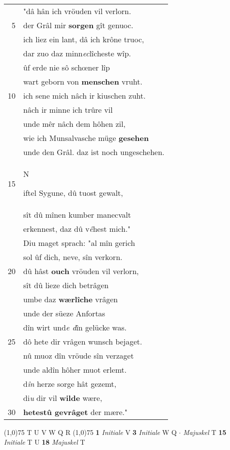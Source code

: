 \documentclass[8pt,a4paper,notitlepage]{article}
\begin{document}
\begin{table}[ht]
\begin{minipage}[t]{0.5\linewidth}
\begin{tabular}{rl}
 & "dâ hân ich vröuden vil verlorn.\\ 
5 & der Grâl mir \textbf{sorgen} gît genuoc.\\ 
 & ich liez ein lant, dâ ich krône truoc,\\ 
 & dar zuo daz minn\textit{ec}lîcheste wîp.\\ 
 & ûf erde nie sô schœner lîp\\ 
 & wart geborn von \textbf{menschen} vruht.\\ 
10 & ich sene mich nâch ir kiuschen zuht.\\ 
 & nâch ir minne ich trûre vil\\ 
 & unde mêr nâch dem hôhen zil,\\ 
 & wie ich Munsalvasche müge \textbf{gesehen}\\ 
 & unde den Grâl. daz ist noch ungeschehen.\\ 
15 & \begin{large}N\end{large}iftel Sygune, dû tuost gewalt,\\ 
 & sît dû mînen kumber manecvalt\\ 
 & erkennest, daz dû v\textit{ê}hest mich."\\ 
 & Diu maget sprach: "al mîn gerich\\ 
 & sol ûf dich, neve, sîn verkorn.\\ 
20 & dû hâst \textbf{ouch} vröuden vil verlorn,\\ 
 & sît dû lieze dich betrâgen\\ 
 & umbe daz \textbf{wærlîche} vrâgen\\ 
 & unde der süeze Anfortas\\ 
 & dîn wirt und\textit{e d}în gelücke was.\\ 
25 & dô hete dir vrâgen wunsch bejaget.\\ 
 & nû muoz dîn vröude sîn verzaget\\ 
 & unde aldîn hôher muot erlemt.\\ 
 & d\textit{în} herze sorge hât gezemt,\\ 
 & di\textit{u} dir vil \textbf{wilde} wære,\\ 
30 & \textbf{hetestû gevrâget} der mære."\\ 
\end{tabular}
\scriptsize
\line(1,0){75} \newline
T U V W Q R \newline
\line(1,0){75} \newline
\textbf{1} \textit{Initiale} V  \textbf{3} \textit{Initiale} W Q   $\cdot$ \textit{Majuskel} T  \textbf{15} \textit{Initiale} T U  \textbf{18} \textit{Majuskel} T  \newline

\end{minipage}
\end{table}
\end{document}
